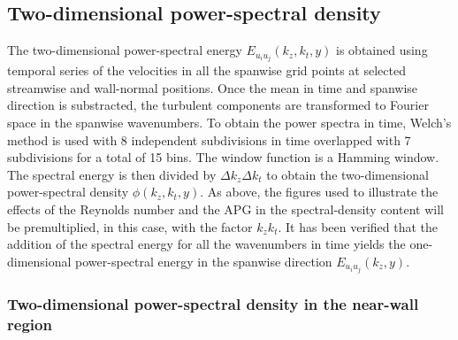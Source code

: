 
\subsection{Two-dimensional power-spectral density}

The two-dimensional power-spectral energy $E_{u_iu_j}(k_z,k_t,y)$ is obtained using temporal series of the velocities in all the spanwise grid points at selected streamwise and wall-normal positions. Once the mean in time and spanwise direction is substracted, the turbulent components are transformed to Fourier space in the spanwise wavenumbers. To obtain the power spectra in time, Welch's method is used with 8 independent subdivisions in time overlapped with 7 subdivisions for a total of 15 bins. The window function is a Hamming window.
The spectral energy is then divided by $\Delta k_z \Delta k_t$ to obtain the two-dimensional power-spectral density $\phi(k_z,k_t,y)$. As above, the figures used to illustrate the effects of the Reynolds number and the APG in the spectral-density content will be premultiplied, in this case, with the factor $k_z k_t$.
It has been verified that the addition of the spectral energy for all the wavenumbers in time yields the one-dimensional power-spectral energy in the spanwise direction $E_{u_i u_j}(k_z,y)$.


\subsubsection{Two-dimensional power-spectral density in the near-wall region}

